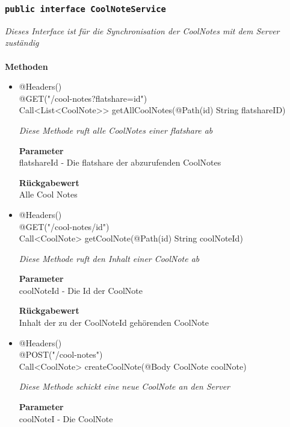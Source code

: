              
             	\subsubsection{\texttt{public interface CoolNoteService }}
        \textit{Dieses Interface ist für die Synchronisation der CoolNotes mit dem Server zuständig}\\
        \\
		\textbf{Methoden} \\
 			\begin{itemize}
        		\item{@Headers()\\@GET("/cool-notes?flatshare={id}")\\ Call<List<CoolNote>> getAllCoolNotes(@Path(\grqq id\grqq) String flatshareID)} 
        	
        		\textit{Diese Methode ruft alle CoolNotes einer flatshare ab}
        	
        		\textbf{Parameter} \\
                flatshareId - Die flatshare der abzurufenden CoolNotes
        		        	
       		 	\textbf{Rückgabewert} \\
                Alle Cool Notes
      		  	 
      	      \item{@Headers() \\ @GET("/cool-notes/{id}")\\ Call<CoolNote> getCoolNote(@Path(\grqq id\grqq) String coolNoteId)}
        	
      	 	 	\textit{Diese Methode ruft den Inhalt einer CoolNote ab }
        	
        		\textbf{Parameter} \\
        		coolNoteId - Die Id der CoolNote 
        	
        		\textbf{Rückgabewert} \\
                Inhalt der zu der CoolNoteId gehörenden CoolNote
        	
              \item{@Headers() \\ @POST("/cool-notes")\\ Call<CoolNote> createCoolNote(@Body CoolNote coolNote)}
        	
      	 	 	\textit{Diese Methode schickt eine neue CoolNote an den Server }
        	
        		\textbf{Parameter} \\
        		coolNoteI - Die CoolNote 
        	

\end{itemize}
